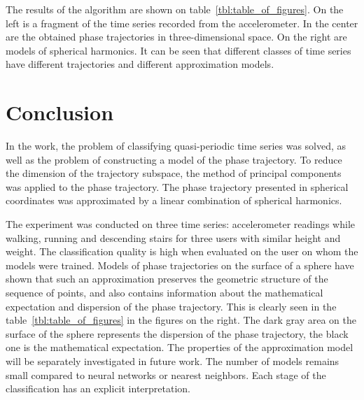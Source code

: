 \documentclass[12pt,twoside]{article}
\begin{document}
The results of the algorithm are shown on table~\ref{tbl:table_of_figures}.
On the left is a fragment of the time series recorded from the accelerometer.
In the center are the obtained phase trajectories in three-dimensional space.
On the right are models of spherical harmonics.
It can be seen that different classes of time series have different trajectories and different approximation models.
\section{Conclusion}

In the work, the problem of classifying quasi-periodic time series was solved, as well as the problem of constructing a model of the phase trajectory.
To reduce the dimension of the trajectory subspace, the method of principal components was applied to the phase trajectory.
The phase trajectory presented in spherical coordinates was approximated by a linear combination of spherical harmonics.

The experiment was conducted on three time series: accelerometer readings while walking, running and descending stairs for three users with similar height and weight.
The classification quality is high when evaluated on the user on whom the models were trained.
Models of phase trajectories on the surface of a sphere have shown that such an approximation preserves the geometric structure of the sequence of points, and also contains information about the mathematical expectation and dispersion of the phase trajectory.
This is clearly seen in the table~\ref{tbl:table_of_figures} in the figures on the right.
The dark gray area on the surface of the sphere represents the dispersion of the phase trajectory, the black one is the mathematical expectation.
The properties of the approximation model will be separately investigated in future work.
The number of models remains small compared to neural networks or nearest neighbors.
Each stage of the classification has an explicit interpretation.

\newpage
\begin{otherlanguage}{english}

\end{otherlanguage}
\end{document}
